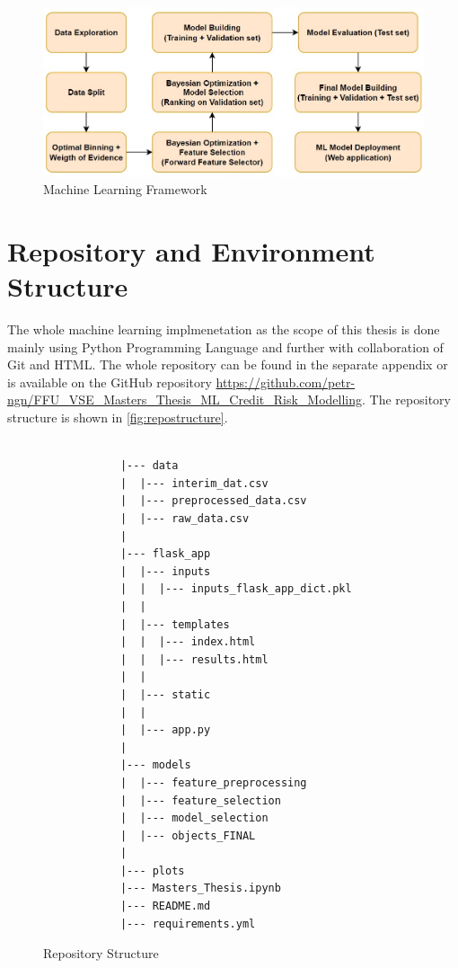 \begin{figure}[H]
\centering
\caption{Machine Learning Framework}\vspace{0.5em}
\label{fig:mlframe}
\includegraphics[width=120mm]{Figures/ml_framework.jpg}

\vspace{-1em}
\end{figure}

\newpage
\section{Repository and Environment Structure}

The whole machine learning implmenetation as the scope of this thesis is done mainly using Python Programming Language and further with collaboration of Git and HTML.
The whole repository can be found in the separate appendix or is available on the GitHub repository \url{https://github.com/petr-ngn/FFU_VSE_Masters_Thesis_ML_Credit_Risk_Modelling}.
The repository structure is shown in \autoref{fig:repostructure}.
\begin{figure}[H]
\centering\caption{Repository Structure}
\label{fig:repostructure}

{\footnotesize
\begin{verbatim}

            |--- data
            |  |--- interim_dat.csv
            |  |--- preprocessed_data.csv
            |  |--- raw_data.csv
            |
            |--- flask_app
            |  |--- inputs
            |  |  |--- inputs_flask_app_dict.pkl
            |  |
            |  |--- templates
            |  |  |--- index.html
            |  |  |--- results.html
            |  |
            |  |--- static
            |  |
            |  |--- app.py
            |
            |--- models
            |  |--- feature_preprocessing
            |  |--- feature_selection
            |  |--- model_selection
            |  |--- objects_FINAL
            |
            |--- plots
            |--- Masters_Thesis.ipynb
            |--- README.md
            |--- requirements.yml
\end{verbatim}
}
\vspace{0em}
\end{figure}


